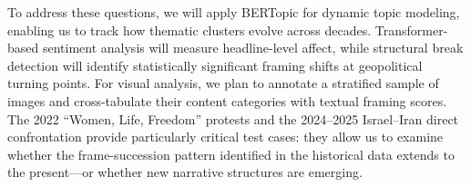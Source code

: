 \documentclass{dhnbpub}
\begin{document}
To address these questions, we will apply BERTopic \citep{Grootendorst2022} for dynamic topic modeling, enabling us to track how thematic clusters evolve across decades. Transformer-based sentiment analysis will measure headline-level affect, while structural break detection will identify statistically significant framing shifts at geopolitical turning points. For visual analysis, we plan to annotate a stratified sample of images and cross-tabulate their content categories with textual framing scores. The 2022 ``Women, Life, Freedom'' protests and the 2024--2025 Israel--Iran direct confrontation provide particularly critical test cases: they allow us to examine whether the frame-succession pattern identified in the historical data extends to the present---or whether new narrative structures are emerging.

\printbibliography
\end{document}

